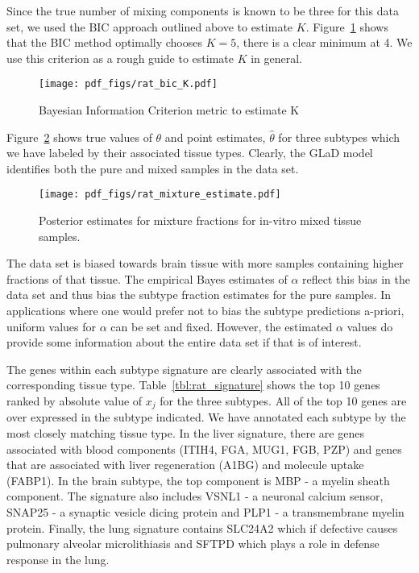\documentclass[11pt]{amsart}
\begin{document}
Since the true number of mixing components is known to be three for this data set, we used the BIC approach outlined above to estimate $K$. Figure~\ref{fig:rat_bic_K} shows that the BIC method optimally chooses $K=5$, there is a clear minimum at 4. We use this criterion as a rough guide to estimate $K$ in general.

\begin{figure}[htbp]
\begin{center}
\texttt{[image: pdf\_figs/rat\_bic\_K.pdf]}
\caption{Bayesian Information Criterion metric to estimate K}
\label{fig:rat_bic_K}
\end{center}
\end{figure}


Figure~\ref{fig:rat_mixture_theta} shows true values of $\theta$ and point estimates, $\hat{\theta}$ for three subtypes which we have labeled by their associated tissue types. Clearly, the GLaD model identifies both the pure and mixed samples in the data set. 

\begin{figure}[htbp]
\begin{center}
\texttt{[image: pdf\_figs/rat\_mixture\_estimate.pdf]}
\caption{Posterior estimates for mixture fractions for in-vitro mixed tissue samples.}
\label{fig:rat_mixture_theta}
\end{center}
\end{figure}

The data set is biased towards brain tissue with more samples containing higher fractions of that tissue. The empirical Bayes estimates of $\alpha$ reflect this bias in the data set and thus bias the subtype fraction estimates for the pure samples. In applications where one would prefer not to bias the subtype predictions a-priori, uniform values for $\alpha$ can be set and fixed. However, the estimated $\alpha$ values do provide some information about the entire data set if that is of interest.

The genes within each subtype signature are clearly associated with the corresponding tissue type. Table~\ref{tbl:rat_signature} shows the top 10 genes ranked by absolute value of $x_{j}$ for the three subtypes. All of the top 10 genes are over expressed in the subtype indicated. We have annotated each subtype by the most closely matching tissue type. In the liver signature, there are genes associated with blood components (ITIH4, FGA, MUG1, FGB, PZP) and genes that are associated with liver regeneration (A1BG) and molecule uptake (FABP1). In the brain subtype, the top component is MBP - a myelin sheath component. The signature also includes VSNL1 - a neuronal calcium sensor, SNAP25 - a synaptic vesicle dicing protein and PLP1 - a transmembrane myelin protein. Finally, the lung signature contains SLC24A2 which if defective causes pulmonary alveolar microlithiasis and SFTPD which plays a role in defense response in the lung.
\end{document}
